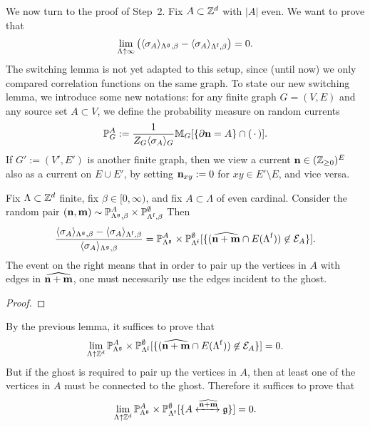We now turn to the proof of Step~2. Fix $A\subset\mathbb Z^d$
with $|A|$ even.
We want to prove that
\begin{equation}
    \label{eq:continuity_target_limit}
    \lim_{\Lambda\uparrow\infty}
    \left(
    \langle\sigma_A\rangle_{\Lambda^\frakg,\beta}
    -\langle\sigma_A\rangle_{\Lambda^\f,\beta}
    \right)
    =
    0.
\end{equation}
The switching lemma is not yet adapted to this setup,
since (until now) we only compared correlation functions on the same graph.
To state our new switching lemma, we introduce some new notations:
for any finite graph $G=(V,E)$ and any source set $A\subset V$,
we define the probability measure on random currents
\[
    \mathbb P_{G}^A:=\frac1{Z_G \langle\sigma_A\rangle_G} \mathbb M_G[\{\partial\mathbf{n}=A\}\cap(\,\cdot\,)].
\]
If $G':=(V',E')$ is another finite graph,
then we view a current $\mathbf{n}\in(\mathbb Z_{\geq 0})^E$
also as a current on $E\cup E'$, by setting $\mathbf{n}_{xy}:=0$ for $xy\in E'\setminus E$,
and vice versa.

\begin{lemma}
    Fix $\Lambda\subset\mathbb Z^d$ finite, fix $\beta\in[0,\infty)$,
    and fix $A\subset\Lambda$ of even cardinal.
    Consider the random pair $(\mathbf{n},\mathbf{m})\sim \mathbb P_{\Lambda^\mathfrak g,\beta}^A\times\mathbb P_{\Lambda^{\operatorname{f}},\beta}^\emptyset$
    Then
    \begin{equation}
        \frac{
            \langle\sigma_A\rangle_{\Lambda^\mathfrak g,\beta}
            -\langle\sigma_A\rangle_{\Lambda^{\operatorname{f}},\beta}
        }{
            \langle\sigma_A\rangle_{\Lambda^\mathfrak g,\beta}
        }
        =
        \mathbb P_{\Lambda^\mathfrak g}^A\times\mathbb P_{\Lambda^{\operatorname{f}}}^\emptyset
        [\{(\widehat{\mathbf{n}+\mathbf{m}}\cap E(\Lambda^{\operatorname{f}}))\not\in\mathcal E_A\}].
    \end{equation}
    The event on the right means that in order to pair up the vertices in $A$
    with edges in $\widehat{\mathbf{n}+\mathbf{m}}$,
    one must necessarily use the edges incident to the ghost.
\end{lemma}

\begin{proof}
    
\end{proof}

By the previous lemma,
it suffices to prove that
\[
    \lim_{\Lambda\uparrow\mathbb Z^d}
    \mathbb P_{\Lambda^\mathfrak g}^A\times\mathbb P_{\Lambda^{\operatorname{f}}}^\emptyset
        [\{(\widehat{\mathbf{n}+\mathbf{m}}\cap E(\Lambda^{\operatorname{f}}))\not\in\mathcal E_A\}]=0.
\]
But if the ghost is required to pair up the vertices in $A$,
then at least one of the vertices in $A$ must be connected to the ghost.
Therefore it suffices to prove that
\[
    \lim_{\Lambda\uparrow\mathbb Z^d}
    \mathbb P_{\Lambda^\mathfrak g}^A\times\mathbb P_{\Lambda^{\operatorname{f}}}^\emptyset
        [\{A \xleftrightarrow{\widehat{\mathbf{n}+\mathbf{m}}}\mathfrak g\}]=0.
\]

